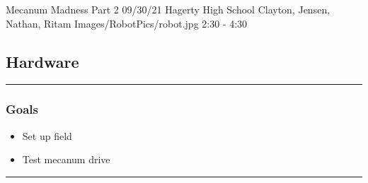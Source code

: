 \insertmeeting 
	{Mecanum Madness Part 2} 
	{09/30/21}
	{Hagerty High School}
	{Clayton, Jensen, Nathan, Ritam}
	{Images/RobotPics/robot.jpg}
	{2:30 - 4:30}
	
\subsection*{Hardware}
\noindent\hfil\rule{\textwidth}{.4pt}\hfil
\subsubsection*{Goals}
\begin{itemize}
    \item Set up field
    \item Test mecanum drive
 

\end{itemize} 

\noindent\hfil\rule{\textwidth}{.4pt}\hfil

